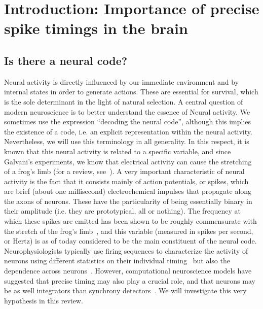 \documentclass[brainsci, %
               review,submit,pdftex,moreauthors%
               ]{Definitions/mdpi}
\begin{document}
%
\section{Introduction: Importance of precise spike timings in the brain}\label{sec:time}
%
\subsection{Is there a neural code?}
%
 Neural activity is directly influenced by our immediate environment and by internal states in order to generate actions. These are essential for survival, which is the sole determinant in the light of natural selection. A central question of modern neuroscience is to better understand the essence of  Neural activity. We sometimes use the expression ``decoding the neural code'', although this implies the existence of a code, i.e. an explicit representation within the neural activity. Nevertheless, we will use this terminology in all generality. In this respect, it is known that this neural activity is related to a specific variable, and since Galvani's experiments, we know that electrical activity can cause the stretching of a frog's limb (for a review, see~\citep{piccolino_luigi_1997}). A very important characteristic of neural activity is the fact that it consists mainly of action potentials, or spikes, which are brief (about one millisecond) electrochemical impulses that propagate along the axons of neurons. These have the particularity of being essentially binary in their amplitude (i.e. they are prototypical, all or nothing).  The frequency at which these spikes are emitted has been shown to be roughly commensurate with the stretch of the frog's limb~\citep{adrian_impulses_1926}, and this variable (measured in spikes per second, or Hertz) is as of today considered to be the main constituent of the neural code. Neurophysiologists typically use firing sequences to characterize the activity of neurons using different statistics on their individual timing~\citep{perkel_neuronal_1967} but also the dependence across neurons~\citep{perkel_neuronal_1967-1}.  However, computational neuroscience models have suggested that precise timing may also play a crucial role, and that neurons may be as well integrators than synchrony detectors~\citep{paugam-moisy_computing_2012}. We will investigate this very hypothesis in this review.
\end{document}
